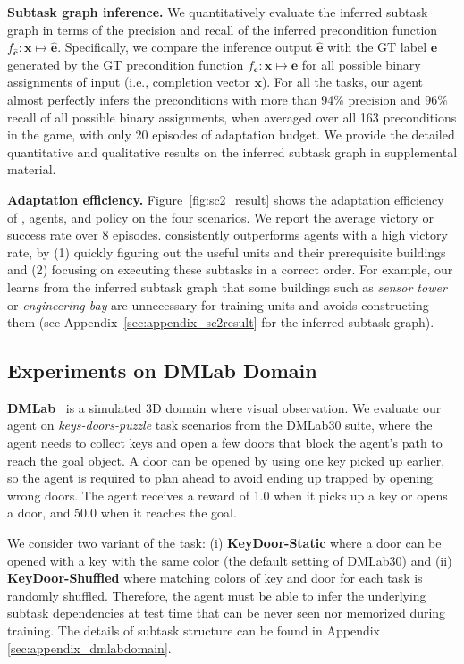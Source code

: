 \documentclass{article} \usepackage{iclr2020_conference,times}
\newcommand{\mb}{\mathbf}
\newcommand{\tb}{\textbf}
\newcommand{\cutsubsectionup}{\vspace*{-0.1in}}
\newcommand{\cutsubsectiondown}{\vspace*{-0.05in}}
\begin{document}
\textbf{Subtask graph inference.}
We quantitatively evaluate the inferred subtask graph in terms of the precision and recall of the inferred precondition function $f_{\widehat{\mb{c}}}:\mb{x}\mapsto \widehat{\mb{e}}$. Specifically, we compare the inference output $\widehat{\mb{e}}$ with the GT label $\mb{e}$ generated by the GT precondition function $f_{\mb{c}}:\mb{x}\mapsto \mb{e}$ for all possible binary assignments of input (i.e., completion vector $\mb{x}$).
For all the tasks, our \NSGIGRProp agent almost perfectly infers the preconditions
with more than 94\% precision and 96\% recall of all possible binary assignments,
when averaged over all 163 preconditions in the game, with only 20 episodes of adaptation budget.
We provide the detailed quantitative and qualitative results on the inferred subtask graph in supplemental material. 

\textbf{Adaptation efficiency.}
Figure~\ref{fig:sc2_result} shows the adaptation efficiency of \NSGIGRProp,  \HRL agents, and \Random policy on the four scenarios. 
We report the average victory or success rate over 8 episodes.
\NSGIGRProp consistently outperforms \HRL agents with a high victory rate,
by (1) quickly figuring out the useful units and their prerequisite buildings and (2) focusing on executing these subtasks in a correct order.
For example, our \NSGIGRProp learns from the inferred subtask graph that some buildings such as \textit{sensor tower} or \textit{engineering bay} are unnecessary for training units and avoids constructing them (see Appendix~\ref{sec:appendix_sc2result} for the inferred subtask graph).

\iffalse
\cutsubsectionup
\subsection{Experiments on DMLab Domain}
\cutsubsectiondown

\tb{DMLab}~\citep{Beattie2016DeepMindLab} is a simulated 3D domain where visual observation.
We evaluate our agent on \emph{keys-doors-puzzle} task scenarios from the DMLab30 suite,
where the agent needs to collect keys and open a few doors that block the agent's path to reach the goal object.
A door can be opened by using one key picked up earlier,
so the agent is required to plan ahead to avoid ending up trapped by opening wrong doors.
The agent receives a reward of 1.0 when it picks up a key or opens a door, and 50.0 when it reaches the goal.

We consider two variant of the task:
(i) \tb{KeyDoor-Static} where a door can be opened with a key with the same color (the default setting of DMLab30)
and (ii) \tb{KeyDoor-Shuffled} where matching colors of key and door for each task is randomly shuffled.
Therefore, the agent must be able to infer the underlying subtask dependencies at test time that can be never seen nor memorized during training.
The details of subtask structure can be found in Appendix \ref{sec:appendix_dmlabdomain}.
\end{document}
